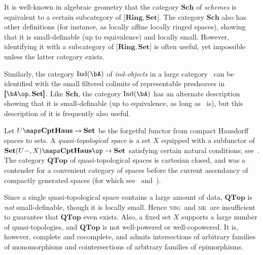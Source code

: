 \documentclass{amsart}
\newcommand{\Set}{\ensuremath{\mathbf{Set}}}
\def\nbg{\textsc{nbg}}
\def\mk{\textsc{mk}}
\begin{document}

\begin{eg}
  It is well-known in algebraic geometry that the category
  $\mathbf{Sch}$ of \emph{schemes} is equivalent to a certain
  subcategory of $\pmb[\mathbf{Ring},\Set\pmb]$.  The category
  $\mathbf{Sch}$ also has other definitions (for instance, as locally
  affine locally ringed spaces), showing that it is small-definable
  (up to equivalence) and locally small.  However, identifying it with
  a subcategory of $\pmb[\mathbf{Ring},\Set\pmb]$ is often useful, yet
  impossible unless the latter category exists.
\end{eg}

\begin{eg}
  Similarly, the category $\operatorname{Ind}(\bA)$ of
  \emph{ind-objects} in a large category \bA\ can be identified with
  the small filtered colimits of representable presheaves in
  $\pmb[\bA\op,\Set\pmb]$.  Like $\mathbf{Sch}$, the category
  $\operatorname{Ind}(\bA)$ has an alternate description showing that
  it is small-definable (up to equivalence, as long as \bA\ is), but
  this description of it is frequently also useful.
\end{eg}


\begin{eg}
  Let $U\maps \mathbf{CptHaus}\to\Set$ be the forgetful functor from
  compact Hausdorff spaces to sets.  A \emph{quasi-topological space}
  is a set $X$ equipped with a subfunctor of $\Set(U-,X)\maps
  \mathbf{CptHaus}\op\to\Set$ satisfying certain natural conditions;
  see~\cite{quasi-topologies}.  The category $\mathbf{QTop}$ of
  quasi-topological spaces is cartesian closed, and was a
  contender for a convenient category of spaces before the current
  ascendancy of compactly generated spaces (for which
  see~\cite[VII.8]{maclane} and~\cite[Ch.~5]{may:concise}).

  Since a single quasi-topological space contains a large amount of
  data, $\mathbf{QTop}$ is \emph{not} small-definable, though it is
  locally small.  Hence \nbg\ and \mk\ are insufficient to guarantee
  that $\mathbf{QTop}$ even exists.  Also, a fixed set $X$ supports a
  large number of quasi-topologies, and $\mathbf{QTop}$ is not
  well-powered or well-copowered.  It is, however, complete and
  cocomplete, and admits intersections of arbitrary families of
  monomorphisms and cointersections of arbitrary families of
  epimorphisms.
\end{eg}
\end{document}
